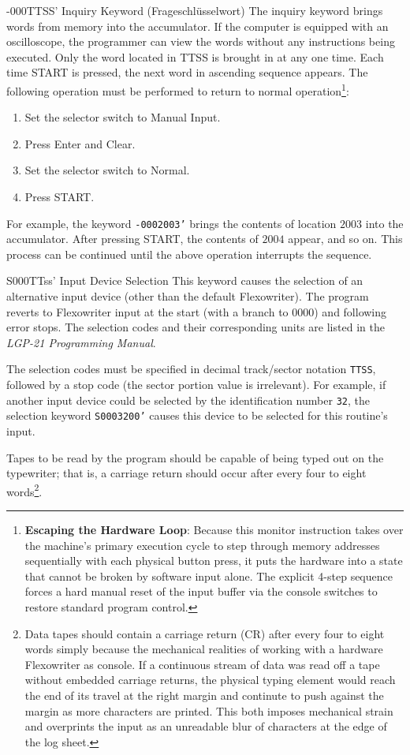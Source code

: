 \documentclass{article}
\begin{document}
\begin{enumerate}
-000TTSS' Inquiry Keyword (Frageschlüsselwort)
The inquiry keyword brings words from memory into the accumulator. If the computer is equipped with an oscilloscope, the programmer can view the words without any instructions being executed. Only the word located in TTSS is brought in at any one time. Each time START is pressed, the next word in ascending sequence appears. The following operation must be performed to return to normal operation\footnote{\textbf{Escaping the Hardware Loop}: Because this monitor instruction takes over the machine's primary execution cycle to step through memory addresses sequentially with each physical button press, it puts the hardware into a state that cannot be broken by software input alone. The explicit 4-step sequence forces a hard manual reset of the input buffer via the console switches to restore standard program control.}:
\begin{enumerate}
	\item Set the selector switch to \textsf{Manual Input}.
	\item Press \textsf{Enter and Clear}.
	\item Set the selector switch to \textsf{Normal}.
	\item Press \textsf{START}.
\end{enumerate}
\noindent
For example, the keyword \texttt{-0002003'} brings the contents of location $2003$ into the accumulator. After pressing \textsf{START}, the contents of $2004$ appear, and so on. This process can be continued until the above operation interrupts the sequence.

S000TTss' Input Device Selection
This keyword causes the selection of an alternative input device (other than the default Flexowriter). The program reverts to Flexowriter input at the start (with a branch to $0000$) and following error stops. The selection codes and their corresponding units are listed in the \textit{LGP-21 Programming Manual}\cite{lgp21programmingmanual}. 

The selection codes must be specified in decimal track/sector notation \texttt{TTSS}, followed by a stop code (the sector portion value is irrelevant). For example, if another input device could be selected by the identification number \texttt{32}, the selection keyword \texttt{S0003200'} causes this device to be selected for this routine's input.

Tapes to be read by the program should be capable of being typed out on the typewriter; that is, a carriage return should occur after every four to eight words\footnote{Data tapes should contain a carriage return (CR) after every four to eight words simply because the mechanical realities of working with a hardware Flexowriter as console. If a continuous stream of data was read off a tape without embedded carriage returns, the physical typing element would reach the end of its travel at the right margin and continute to push against the margin as more characters are printed. This both imposes mechanical strain and overprints the input as an unreadable blur of characters at the edge of the log sheet.}.


\end{enumerate}
\end{document}
